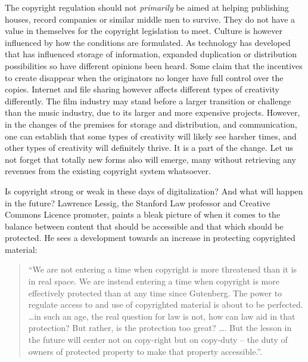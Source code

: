 The copyright regulation should not \textit{primarily} be aimed at helping
publishing houses, record companies or similar middle men to survive. They do
not have a value in themselves for the copyright legislation to meet. Culture is
however inf\hbox{}luenced by how the conditions are formulated. As technology has
developed that has inf\hbox{}luenced storage of information, expanded duplication or
distribution possibilities so have dif\hbox{}ferent opinions been heard. Some claim
that the incentives to create disappear when the originators no longer have full
control over the copies. Internet and f\hbox{}ile sharing however af\hbox{}fects dif\hbox{}ferent
types of creativity dif\hbox{}ferently. The f\hbox{}ilm industry may stand before a larger
transition or challenge than the music industry, due to its larger and more
expensive projects. However, in the changes of the premises for storage and
distribution, and communication, one can establish that some types of creativity
will likely see harsher times, and other types of creativity will def\hbox{}initely
thrive. It is a part of the change. Let us not forget that totally new forms
also will emerge, many without retrieving any revenues from the existing
copyright system whatsoever.

Is copyright strong or weak in these days of digitalization? And what will
happen in the future? Lawrence Lessig, the Stanford Law professor and Creative
Commons Licence promoter, paints a bleak picture of when it comes to the balance
between content that should be accessible and that which should be protected. He
sees a development towards an increase in protecting copyrighted material: 

\begin{quote}
``We are not entering a time when copyright is more threatened than it is in
real space. We are instead entering a time when copyright is more ef\hbox{}fectively
protected than at any time since Gutenberg. The power to regulate access to and
use of copyrighted material is about to be perfected. \ldots in such an age, the
real question for law is not, how can law aid in that protection? But rather, is
the protection too great? \ldots. But the lesson in the future will center not
on copy-right but on copy-duty – the duty of owners of protected property to
make that property accessible.''\cite{darling-lessig06}. 
\end{quote}

